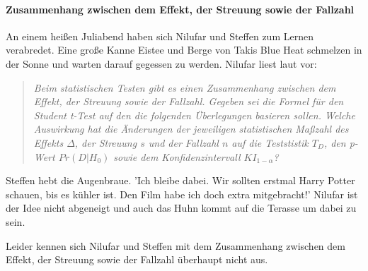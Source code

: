 \documentclass[a4paper, 9pt]{scrartcl}\usepackage[]{graphicx}\usepackage[]{xcolor}
\begin{document}
\paragraph{Zusammenhang zwischen dem Effekt, der Streuung sowie der Fallzahl}

An einem heißen Juliabend haben sich Nilufar und Steffen zum Lernen verabredet. Eine große Kanne Eistee und Berge von Takis Blue Heat schmelzen in der Sonne  und warten darauf gegessen zu werden. Nilufar liest laut vor:\begin{quote}
                 \textit{
                 Beim statistischen Testen gibt es einen Zusammenhang zwischen dem Effekt, der Streuung sowie der Fallzahl. Gegeben sei die Formel für den Student t-Test auf den die folgenden Überlegungen basieren sollen. Welche Auswirkung hat die Änderungen der jeweiligen statistischen Maßzahl des Effekts $\Delta$, der Streuung $s$ und der Fallzahl $n$ auf die Teststistik $T_{D}$, den p-Wert $Pr(D|H_0)$ sowie dem Konfidenzintervall $KI_{1-\alpha}$?
                 }
                 \end{quote}Steffen hebt die Augenbraue. 'Ich bleibe dabei. Wir sollten erstmal Harry Potter schauen, bis es kühler ist. Den Film habe ich doch extra mitgebracht!' Nilufar ist der Idee nicht abgeneigt und auch das Huhn kommt auf die Terasse um dabei zu sein.

\vspace{1ex}

Leider kennen sich Nilufar und Steffen mit dem Zusammenhang zwischen dem Effekt, der Streuung sowie der Fallzahl überhaupt nicht aus. 
\end{document}
